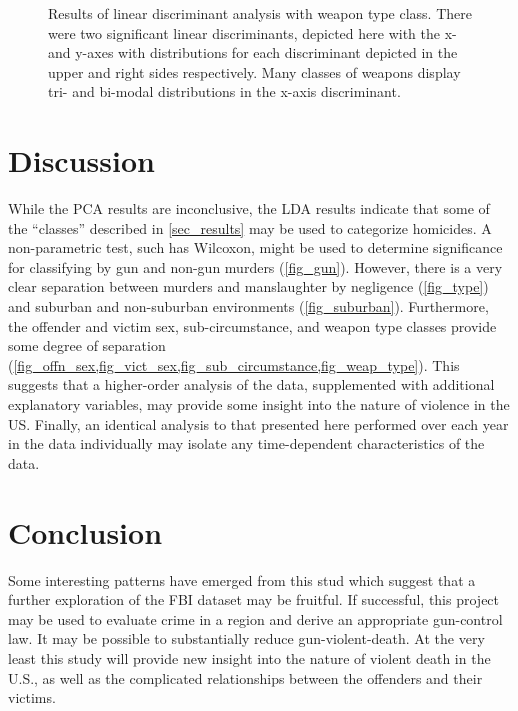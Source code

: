 \documentclass{evanarticle}
\begin{document}
\begin{figure}[H]
  \caption{Results of linear discriminant analysis with weapon type class.  There were two significant linear discriminants, depicted here with the x- and y-axes with distributions for each discriminant depicted in the upper and right sides respectively.  Many classes of weapons display tri- and bi-modal distributions in the x-axis discriminant.}
  \label{fig_weap_type}

\end{figure}

\newpage

\section{Discussion}

While the PCA results are inconclusive, the LDA results indicate that some of the ``classes'' described in \cref{sec_results} may be used to categorize homicides.
A non-parametric test, such has Wilcoxon, might be used to determine significance for classifying by gun and non-gun murders (\cref{fig_gun}).
However, there is a very clear separation between murders and manslaughter by negligence (\cref{fig_type}) and suburban and non-suburban environments (\cref{fig_suburban}).
Furthermore, the offender and victim sex, sub-circumstance, and weapon type classes provide some degree of separation (\cref{fig_offn_sex,fig_vict_sex,fig_sub_circumstance,fig_weap_type}).
This suggests that a higher-order analysis of the data, supplemented with additional explanatory variables, may provide some insight into the nature of violence in the US.
Finally, an identical analysis to that presented here performed over each year in the data individually may isolate any time-dependent characteristics of the data.

\section{Conclusion}

Some interesting patterns have emerged from this stud which suggest that a further exploration of the FBI dataset may be fruitful.
If successful, this project may be used to evaluate crime in a region and derive an appropriate gun-control law.
It may be possible to substantially reduce gun-violent-death.
At the very least this study will provide new insight into the nature of violent death in the U.S., as well as the complicated relationships between the offenders and their victims.

\printbibliography

\end{document}
